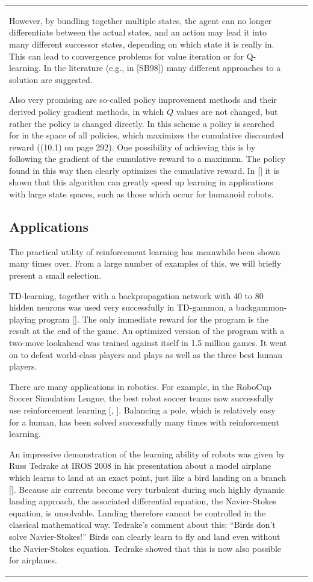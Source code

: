 \documentclass[10pt]{book}
\begin{document}
\begin{center}
\begin{tabular}{|l|l|l|}
However, by bundling together multiple states, the agent can no longer differentiate between the actual states, and an action may lead it into many different successor states, depending on which state it is really in. This can lead to convergence problems for value iteration or for Q-learning. In the literature (e.g., in [SB98]) many different approaches to a solution are suggested.

Also very promising are so-called policy improvement methods and their derived policy gradient methods, in which $Q$ values are not changed, but rather the policy is changed directly. In this scheme a policy is searched for in the space of all policies, which maximizes the cumulative discounted reward ((10.1) on page 292). One possibility of achieving this is by following the gradient of the cumulative reward to a maximum. The policy found in this way then clearly optimizes the cumulative reward. In [\cite{ps08}] it is shown that this algorithm can greatly speed up learning in applications with large state spaces, such as those which occur for humanoid robots.

\subsection{Applications}
The practical utility of reinforcement learning has meanwhile been shown many times over. From a large number of examples of this, we will briefly present a small selection.

TD-learning, together with a backpropagation network with 40 to 80 hidden neurons was used very successfully in TD-gammon, a backgammon-playing program [\cite{tes95}]. The only immediate reward for the program is the result at the end of the game. An optimized version of the program with a two-move lookahead was trained against itself in 1.5 million games. It went on to defeat world-class players and plays as well as the three best human players.

There are many applications in robotics. For example, in the RoboCup Soccer Simulation League, the best robot soccer teams now successfully use reinforcement learning [\cite{ssk05}, \cite{robb}]. Balancing a pole, which is relatively easy for a human, has been solved successfully many times with reinforcement learning.

An impressive demonstration of the learning ability of robots was given by Russ Tedrake at IROS 2008 in his presentation about a model airplane which learns to land at an exact point, just like a bird landing on a branch [\cite{ted08}]. Because air currents become very turbulent during such highly dynamic landing approach, the associated differential equation, the Navier-Stokes equation, is unsolvable. Landing therefore cannot be controlled in the classical mathematical way. Tedrake's comment about this: ``Birds don't solve Navier-Stokes!'' Birds can clearly learn to fly and land even without the Navier-Stokes equation. Tedrake showed that this is now also possible for airplanes.


\end{tabular}
\end{center}
\end{document}
